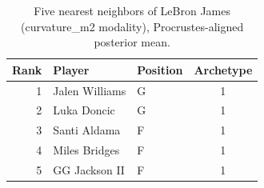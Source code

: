 \begin{table}[htbp]
  \centering\small
  \begin{tabular}{rllc}
    \toprule
    Rank & Player & Position & Archetype \\
    \midrule
    1 & Jalen Williams & G & 1 \\
    2 & Luka Doncic & G & 1 \\
    3 & Santi Aldama & F & 1 \\
    4 & Miles Bridges & F & 1 \\
    5 & GG Jackson II & F & 1 \\
    \bottomrule
  \end{tabular}
  \caption{Five nearest neighbors of LeBron James (curvature_m2 modality), Procrustes-aligned posterior mean.}
  \label{tab:LeBron_James_neighbors_curvature_m2}
\end{table}

